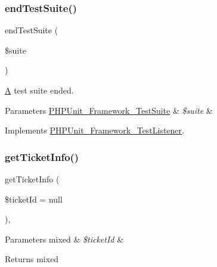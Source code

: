 \subsubsection{\texorpdfstring{end\+Test\+Suite()}{endTestSuite()}}
{\footnotesize\ttfamily end\+Test\+Suite (\begin{DoxyParamCaption}\item[{\mbox{\hyperlink{class_p_h_p_unit___framework___test_suite}{P\+H\+P\+Unit\+\_\+\+Framework\+\_\+\+Test\+Suite}}}]{\$suite }\end{DoxyParamCaption})}

\mbox{\hyperlink{class_a}{A}} test suite ended.


\begin{DoxyParams}[1]{Parameters}
\mbox{\hyperlink{class_p_h_p_unit___framework___test_suite}{P\+H\+P\+Unit\+\_\+\+Framework\+\_\+\+Test\+Suite}} & {\em \$suite} & \\
\hline
\end{DoxyParams}


Implements \mbox{\hyperlink{interface_p_h_p_unit___framework___test_listener_aeec28a4d1328434916ebcdc1ca6b5527}{P\+H\+P\+Unit\+\_\+\+Framework\+\_\+\+Test\+Listener}}.

\mbox{\label{class_p_h_p_unit___extensions___ticket_listener_a42ca3719940bd24c420952a1915c0bf2}} 
\subsubsection{\texorpdfstring{get\+Ticket\+Info()}{getTicketInfo()}}
{\footnotesize\ttfamily get\+Ticket\+Info (\begin{DoxyParamCaption}\item[{}]{\$ticket\+Id = {\ttfamily null} }\end{DoxyParamCaption})\hspace{0.3cm}{\ttfamily [abstract]}, {\ttfamily [protected]}}


\begin{DoxyParams}[1]{Parameters}
mixed & {\em \$ticket\+Id} & \\
\hline
\end{DoxyParams}
\begin{DoxyReturn}{Returns}
mixed 
\end{DoxyReturn}
\mbox{\label{class_p_h_p_unit___extensions___ticket_listener_a1a9bddc54f26bb3fb5c2ec9778ea5198}} 

